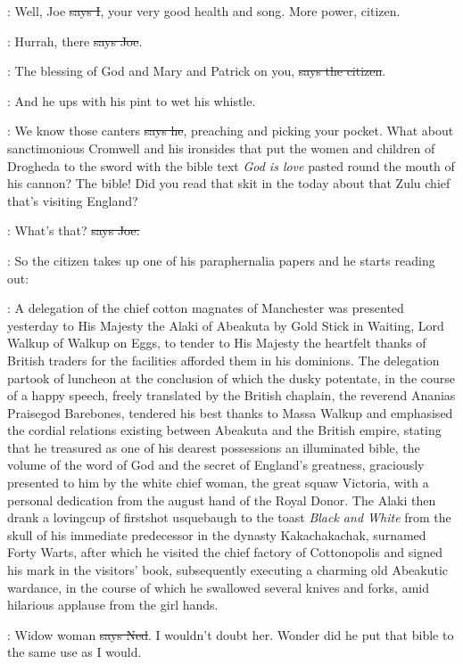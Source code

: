 :
Well, Joe \sout{says I},
your very good health and song. More power, citizen.

\joe:
Hurrah, there \sout{says Joe}.

\citizen:
The blessing of God and Mary and Patrick on you,
\sout{says the citizen}.

\Nq:
And he ups with his pint to wet his whistle.

\citizen:
We know those canters \sout{says he},
preaching and picking your pocket.
What about sanctimonious Cromwell and his ironsides that put the women
and children of Drogheda to the sword with the bible text \emph{God is love}
pasted round the mouth of his cannon? The bible! Did you read that skit in
the  today
about that Zulu chief that's visiting England?

\joe:
What's that? \sout{says Joe.}

\Nq:
So the citizen takes up one of his paraphernalia papers and he starts
reading out:

\citizen:
A delegation of the chief cotton
magnates of Manchester was presented
yesterday to His Majesty the Alaki of Abeakuta by Gold Stick in Waiting,
Lord Walkup of Walkup on Eggs, to tender to His Majesty the heartfelt
thanks of British traders for the facilities afforded them in his
dominions. The delegation partook of luncheon at the conclusion
of which the dusky potentate, in the course of a happy speech,
freely translated by the British chaplain, the reverend Ananias
Praisegod Barebones, tendered his best thanks to Massa Walkup and
emphasised the cordial relations existing between Abeakuta and the
British empire, stating that he treasured as one of his dearest
possessions an illuminated bible, the volume of the word of God
and the secret of England's greatness, graciously presented to him by
the white chief woman, the great squaw Victoria, with a personal
dedication from the august hand of the Royal Donor. The Alaki then drank a
lovingcup of firstshot usquebaugh to the toast \emph{Black and White} from the
skull of his immediate predecessor in the dynasty Kakachakachak,
surnamed Forty Warts, after which he visited the chief factory of
Cottonopolis and signed his mark in the visitors' book, subsequently
executing a charming old Abeakutic wardance, in the course of which he
swallowed several knives and forks, amid hilarious applause from the girl
hands.

\lambert:
Widow woman \sout{says Ned}.
I wouldn't doubt her. Wonder did he put that
bible to the same use as I would.

